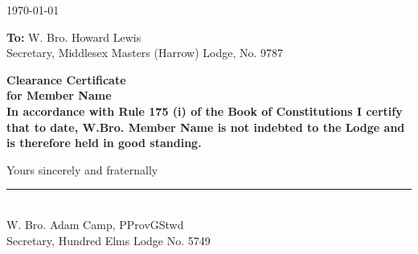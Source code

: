 \documentclass{lodgebrand}
\begin{document}
\vspace*{12mm}
\small\color{textgray}
\begin{minipage}{0.6\textwidth}
\LodgeAddress
\end{minipage}
\hfill
\begin{minipage}{0.35\textwidth}
\raggedleft \today
\end{minipage}

\vspace{10mm}
\normalsize
\textbf{To:} W. Bro. Howard Lewis\\
Secretary, Middlesex Masters (Harrow) Lodge, No. 9787

\vspace{6mm}
\centering\Large\bfseries Clearance Certificate\\[1ex]
\normalsize\centering for \textbf{{Member Name}}\\[2ex]
\justifying
In accordance with Rule 175 (i) of the Book of Constitutions I certify that to date, W.Bro. \textbf{{Member Name}} is not indebted to the Lodge and is therefore held in good standing.

\vspace{16mm}
\raggedright
Yours sincerely and fraternally\\[14mm]
\rule{60mm}{0.4pt}\\
W. Bro. Adam Camp, PProvGStwd\\
Secretary, Hundred Elms Lodge No. 5749
\end{document}
